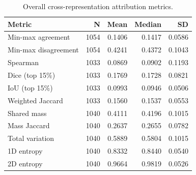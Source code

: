 \begin{table}[t]
\caption{Overall cross-representation attribution metrics.}
\label{tab:01_overall_agreement}
\begin{tabular}{lrrrr}
\toprule
Metric & N & Mean & Median & SD \\
\midrule
Min-max agreement & 1054 & 0.1406 & 0.1417 & 0.0586 \\
Min-max disagreement & 1054 & 0.4241 & 0.4372 & 0.1043 \\
Spearman & 1033 & 0.0869 & 0.0902 & 0.1193 \\
Dice (top 15\%) & 1033 & 0.1769 & 0.1728 & 0.0821 \\
IoU (top 15\%) & 1033 & 0.0993 & 0.0946 & 0.0506 \\
Weighted Jaccard & 1033 & 0.1560 & 0.1537 & 0.0553 \\
Shared mass & 1040 & 0.4111 & 0.4196 & 0.1015 \\
Mass Jaccard & 1040 & 0.2637 & 0.2655 & 0.0782 \\
Total variation & 1040 & 0.5889 & 0.5804 & 0.1015 \\
1D entropy & 1040 & 0.8332 & 0.8440 & 0.0540 \\
2D entropy & 1040 & 0.9664 & 0.9819 & 0.0526 \\
\bottomrule
\end{tabular}
\end{table}
